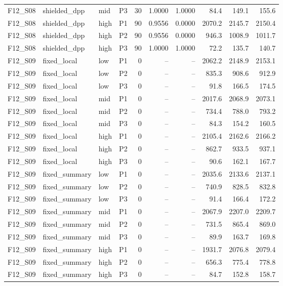\begin{longtable}{llllrrrrrr}
F12\_S08 & shielded\_dpp & mid & P3 & 30 & 1.0000 & 1.0000 & 84.4 & 149.1 & 155.6 \\
F12\_S08 & shielded\_dpp & high & P1 & 90 & 0.9556 & 0.0000 & 2070.2 & 2145.7 & 2150.4 \\
F12\_S08 & shielded\_dpp & high & P2 & 90 & 0.9556 & 0.0000 & 946.3 & 1008.9 & 1011.7 \\
F12\_S08 & shielded\_dpp & high & P3 & 90 & 1.0000 & 1.0000 & 72.2 & 135.7 & 140.7 \\
F12\_S09 & fixed\_local & low & P1 & 0 & -- & -- & 2062.2 & 2148.9 & 2153.1 \\
F12\_S09 & fixed\_local & low & P2 & 0 & -- & -- & 835.3 & 908.6 & 912.9 \\
F12\_S09 & fixed\_local & low & P3 & 0 & -- & -- & 91.8 & 166.5 & 174.5 \\
F12\_S09 & fixed\_local & mid & P1 & 0 & -- & -- & 2017.6 & 2068.9 & 2073.1 \\
F12\_S09 & fixed\_local & mid & P2 & 0 & -- & -- & 734.4 & 788.0 & 793.2 \\
F12\_S09 & fixed\_local & mid & P3 & 0 & -- & -- & 84.3 & 154.2 & 160.5 \\
F12\_S09 & fixed\_local & high & P1 & 0 & -- & -- & 2105.4 & 2162.6 & 2166.2 \\
F12\_S09 & fixed\_local & high & P2 & 0 & -- & -- & 862.7 & 933.5 & 937.1 \\
F12\_S09 & fixed\_local & high & P3 & 0 & -- & -- & 90.6 & 162.1 & 167.7 \\
F12\_S09 & fixed\_summary & low & P1 & 0 & -- & -- & 2035.6 & 2133.6 & 2137.1 \\
F12\_S09 & fixed\_summary & low & P2 & 0 & -- & -- & 740.9 & 828.5 & 832.8 \\
F12\_S09 & fixed\_summary & low & P3 & 0 & -- & -- & 91.4 & 166.4 & 172.2 \\
F12\_S09 & fixed\_summary & mid & P1 & 0 & -- & -- & 2067.9 & 2207.0 & 2209.7 \\
F12\_S09 & fixed\_summary & mid & P2 & 0 & -- & -- & 731.5 & 865.4 & 869.0 \\
F12\_S09 & fixed\_summary & mid & P3 & 0 & -- & -- & 89.9 & 163.7 & 169.8 \\
F12\_S09 & fixed\_summary & high & P1 & 0 & -- & -- & 1931.7 & 2076.8 & 2079.4 \\
F12\_S09 & fixed\_summary & high & P2 & 0 & -- & -- & 656.3 & 775.4 & 778.8 \\
F12\_S09 & fixed\_summary & high & P3 & 0 & -- & -- & 84.7 & 152.8 & 158.7 \\

\end{longtable}
